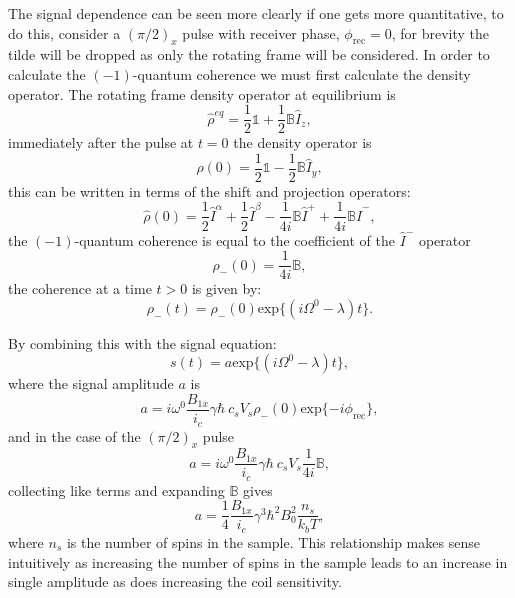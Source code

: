 The signal dependence can be seen more clearly if one gets more quantitative, to do this,
consider a $(\pi/2)_x$ pulse with receiver phase, $\phi_{\text{rec}} = 0$, for brevity the
tilde will be dropped as only the rotating frame will be considered. In order to calculate the $(-1)$-quantum coherence we must
first calculate the density operator. The rotating frame density operator at equilibrium is
\begin{equation}
  \hat{\rho}^{eq} = \frac{1}{2}\mathbb{1} + \frac{1}{2}\mathbb{B}\hat{I}_z,
\end{equation}
immediately after the pulse at $t=0$ the density operator is
\begin{equation}
  \hat{\rho}(0) = \frac{1}{2}\mathbb{1} - \frac{1}{2}\mathbb{B}\hat{I}_y,
\end{equation}
this can be written in terms of the shift and projection operators:
\begin{equation}
  \hat{\rho}(0) = \frac{1}{2}\hat{I}^{\alpha} + \frac{1}{2}\hat{I}^{\beta} - \frac{1}{4i}\mathbb{B}\hat{I}^+ + \frac{1}{4i}\mathbb{B}\hat{I}^-,
\end{equation}
the $(-1)$-quantum coherence is equal to the coefficient of the $\hat{I}^-$ operator
\begin{equation}
  \rho_-(0) = \frac{1}{4i}\mathbb{B},
\end{equation}
the coherence at a time $t>0$ is given by:
\begin{equation}
  \rho_-(t) = \rho_-(0)\text{exp}\{(i\Omega^0 -\lambda)t\}.
\end{equation}

By combining this with the signal equation:
\begin{equation}
  s(t) = a \text{exp}\{(i\Omega^0 -\lambda)t\},
\end{equation}
where the signal amplitude $a$ is
\begin{equation}
  a = i\omega^0\frac{B_{1x}}{i_c}\gamma\hbar~c_sV_s\rho_-(0)\text{exp}\{-i\phi_{\text{rec}}\},
\end{equation}
and in the case of the $(\pi/2)_x$ pulse
\begin{equation}
  a = i\omega^0\frac{B_{1x}}{i_c}\gamma\hbar~c_sV_s\frac{1}{4i}\mathbb{B},
\end{equation}
collecting like terms and expanding $\mathbb{B}$ gives
\begin{equation}
  a = \frac{1}{4}\frac{B_{1x}}{i_c}\gamma^3\hbar^2B_0^2\frac{n_s}{k_bT},
\end{equation}
where $n_s$ is the number of spins in the sample. This relationship makes sense intuitively
as increasing the number of spins in the sample leads to an increase in single amplitude as does increasing the
coil sensitivity.


